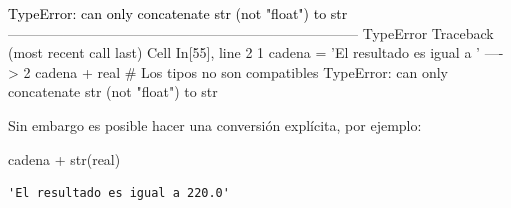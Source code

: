 \documentclass[
  spanish,
  letterpaper,
]{scrbook}
\newenvironment{Shaded}{\begin{snugshade}}{\end{snugshade}}
\newcommand{\BuiltInTok}[1]{\textcolor[rgb]{0.00,0.23,0.31}{#1}}
\newcommand{\NormalTok}[1]{\textcolor[rgb]{0.00,0.23,0.31}{#1}}
\newcommand{\OperatorTok}[1]{\textcolor[rgb]{0.37,0.37,0.37}{#1}}
\theoremstyle{definition}
\theoremstyle{remark}
\begin{document}
\begin{Highlighting}
\textcolor{black}{TypeError: can only concatenate str (not "float") to str}
\textcolor{black}{}\textcolor{QuartoInternalColor1}{---------------------------------------------------------------------------}\textcolor{QuartoInternalColor2}{}
\textcolor{QuartoInternalColor2}{}\textcolor{QuartoInternalColor1}{TypeError}\textcolor{QuartoInternalColor2}{                                 Traceback (most recent call last)}
\textcolor{QuartoInternalColor2}{}\textcolor{QuartoInternalColor3}{Cell}\textcolor{QuartoInternalColor2}{}\textcolor{QuartoInternalColor3}{ }\textcolor{QuartoInternalColor2}{}\textcolor{QuartoInternalColor4}{In[55]}\textcolor{QuartoInternalColor2}{}\textcolor{QuartoInternalColor4}{, line 2}\textcolor{QuartoInternalColor2}{}
\textcolor{QuartoInternalColor2}{}\textcolor{QuartoInternalColor4}{      1}\textcolor{QuartoInternalColor2}{ cadena = }\textcolor{QuartoInternalColor6}{'}\textcolor{QuartoInternalColor2}{}\textcolor{QuartoInternalColor6}{El resultado es igual a }\textcolor{QuartoInternalColor2}{}\textcolor{QuartoInternalColor6}{'}\textcolor{QuartoInternalColor2}{}
\textcolor{QuartoInternalColor2}{}\textcolor{QuartoInternalColor4}{----> }\textcolor{QuartoInternalColor2}{}\textcolor{QuartoInternalColor4}{2}\textcolor{QuartoInternalColor2}{ }\textcolor{QuartoInternalColor2}{cadena}\textcolor{QuartoInternalColor2}{}\textcolor{QuartoInternalColor2}{ }\textcolor{QuartoInternalColor2}{}\textcolor{QuartoInternalColor2}{+}\textcolor{QuartoInternalColor2}{}\textcolor{QuartoInternalColor2}{ }\textcolor{QuartoInternalColor2}{}\textcolor{QuartoInternalColor2}{real}\textcolor{QuartoInternalColor2}{  }\textcolor{QuartoInternalColor9}{# Los tipos no son compatibles}\textcolor{QuartoInternalColor2}{}
\textcolor{QuartoInternalColor2}{}\textcolor{QuartoInternalColor1}{TypeError}\textcolor{QuartoInternalColor2}{: can only concatenate str (not "float") to str}
\end{Highlighting}

Sin embargo es posible hacer una conversión explícita, por ejemplo:

\begin{Shaded}
\begin{Highlighting}[]
\NormalTok{cadena }\OperatorTok{+} \BuiltInTok{str}\NormalTok{(real)}
\end{Highlighting}
\end{Shaded}

\begin{verbatim}
'El resultado es igual a 220.0'
\end{verbatim}
\end{document}
